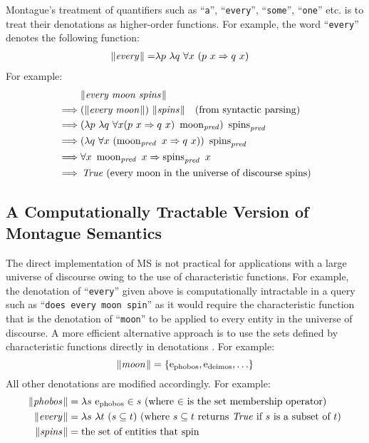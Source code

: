\documentclass[../main.tex]{subfiles}
\begin{document}
\begin{refsection}
Montague's treatment of quantifiers such as ``\texttt{a}'', ``\texttt{every}'', ``\texttt{some}'', ``\texttt{one}'' etc. is to treat their
denotations as higher-order functions. For example, the word ``\texttt{every}'' denotes the following function:
\begin{align*}
	\lVert\textit{every\hspace{0.1em}}\rVert =& \lambda p \  \lambda q \  \forall x \  (p \  x \Rightarrow q \  x)
\end{align*}
For example:
\begin{equation*}
	\begin{split}
		& \lVert\textit{every moon spins\hspace{0.1em}}\rVert \\
		\implies&  (\lVert\textit{every moon\hspace{0.1em}}\rVert) \  \lVert\textit{spins\hspace{0.1em}}\rVert \quad(\text{from syntactic parsing}) \\
		\implies&  (\lambda p \  \lambda q \  \forall x (p \  x \Rightarrow q \  x) \  \operatorname{\operatorname{moon}}_{\operatorname{\mathit{pred}}}) \  \operatorname{\operatorname{spins}}_{\operatorname{\mathit{pred}}} \\
		\implies&  (\lambda q \  \forall x \  (\operatorname{\operatorname{moon}}_{\operatorname{\mathit{pred}}} \   x \Rightarrow q \   x)) \  \operatorname{spins}_{\operatorname{\mathit{pred}}} \\
		\implies&  \forall x \  \operatorname{\operatorname{moon}}_{\operatorname{\mathit{pred}}} \ x \Rightarrow \operatorname{spins}_{\operatorname{\mathit{pred}}} \   x \\
		\implies&  \operatorname{\mathit{True}}\ (\text{every moon in the universe of discourse spins})
	\end{split}
\end{equation*}
\subsection{A Computationally Tractable Version of Montague Semantics} %
\label{icsc2020conf:frostmont}
The direct implementation of MS is not practical for applications with a large universe of discourse
owing to the use of characteristic functions. For example, the denotation of ``\texttt{every}'' given above is
computationally intractable in a query such as ``\texttt{does every moon spin}'' as it would require the
characteristic function that is the denotation of ``\texttt{moon}'' to be applied to every entity in the universe of
discourse. A more efficient alternative approach is to use the sets defined by characteristic functions
directly in denotations \cite{frost1989constructing, frost2002efficient}. For example:
\[ \lVert\textit{moon\hspace{0.1em}}\rVert = \{\mathrm{e}_{\operatorname{\operatorname{phobos}}} , \mathrm{e}_{\operatorname{\operatorname{deimos}}}, \ldots\} \]
All other denotations are modified accordingly. For example:
\begin{align*}
	\meaningof{phobos} &= \lambda s \ \entityassoc{\phobos} \in s\ \dmathrm{(where $\in$ is the set membership operator)} \\
	\meaningof{every} &= \lambda s \  \lambda t \ (s \subseteq t)\ \dmathrm{(where $s \subseteq t$ returns $\True$ if $s$ is a subset of $t$)} \\
	\meaningof{spins} &= \dmathrm{the set of entities that spin}
\end{align*}


\end{refsection}
\end{document}
